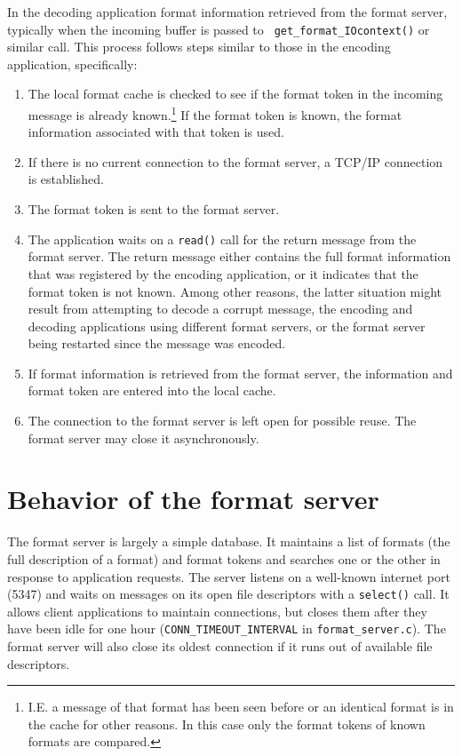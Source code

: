 \documentclass{article}
\begin{document}
In the decoding application format information retrieved from the format
server, typically when the incoming buffer is passed to {\tt
get\_format\_IOcontext()} or similar call.  This process follows steps
similar to those in the encoding application, specifically:
\begin{enumerate}
\item The local format cache is checked to see if the format token in the
incoming message is already known.\footnote{I.E. a message of that format
has been seen before or an identical format is in the cache for other
reasons.  In this case only the format tokens of known formats are
compared.}  If the format token is known, the format information associated
with that token is used.
\item If there is no current connection to the format server, a TCP/IP
connection is established.
\item The format token is sent to the format server.
\item The application waits on a {\tt read()} call for the return message
from the format server.  The return message either contains the full format
information that was registered by the encoding application, or it indicates
that the format token is not known.  Among other reasons, the latter
situation might result from attempting to decode a corrupt message, the
encoding and decoding applications using different format servers, or the
format server being restarted since the message was encoded.
\item If format information is retrieved from the format server, the
information and format token are entered into the local cache. 
\item The connection to the format server is left open for possible reuse.
The format server may close it asynchronously.
\end{enumerate}

\section{Behavior of the format server}
The format server is largely a simple database.  It maintains a list of
formats (the full description of a format) and format tokens and searches
one or the other in response to application requests.  The server listens on
a well-known internet port (5347) and waits on messages on its open file
descriptors with a {\tt select()} call.  It allows client applications to
maintain connections, but closes them after they have been idle for one hour
({\tt CONN\_TIMEOUT\_INTERVAL} in {\tt format\_server.c}).  The format
server will also close its oldest connection if it runs out of available
file descriptors.
\end{document}
